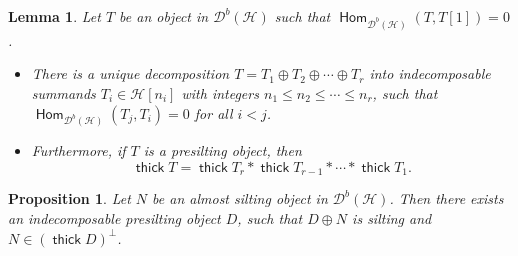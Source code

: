 \documentclass[10pt,a4paper]{amsart}
\newtheorem{lemma}{Lemma}
\newtheorem{proposition}{Proposition}
\newcommand{\Hom}{\opname{Hom}}
\newcommand{\cd}{{\mathcal D}}
\newcommand{\der}{\cd}
\newcommand{\opname}[1]{\operatorname{\mathsf{#1}}}
\newcommand{\thick}{\opname{thick}}
\begin{document}
\begin{lemma}\label{l:no-cycle-plus} Let $T$ be an object in $\der^b(\mathcal{H})$ such that $\Hom_{\der^b(\mathcal{H})}(T, T[1])=0$.
\begin{itemize}
    \item[(a)]  There is a unique decomposition $T =  T_1 \oplus T_2 \oplus \cdots \oplus T_r$ into indecomposable summands $T_i \in \mathcal{H}[n_i]$ with integers $n_1 \leq n_2 \leq \cdots \leq n_r$, such that $\Hom_{\der^b(\mathcal{H})}(T_j, T_i) = 0$ for all $i < j$.
    \item[(b)] Furthermore, if $T$ is a presilting object, then 
    \[
\thick T = \thick T_r * \thick T_{r-1} * \cdots * \thick T_1.
\]
\end{itemize}
\end{lemma}

\begin{proposition}\label{p: ind-perp-completion}
Let $N$ be an almost silting object in $\der^b(\mathcal{H})$. Then there exists an indecomposable presilting object $D$, such that $D \oplus N$ is silting and $N \in (\thick D)^\perp$.
\end{proposition}
\end{document}
